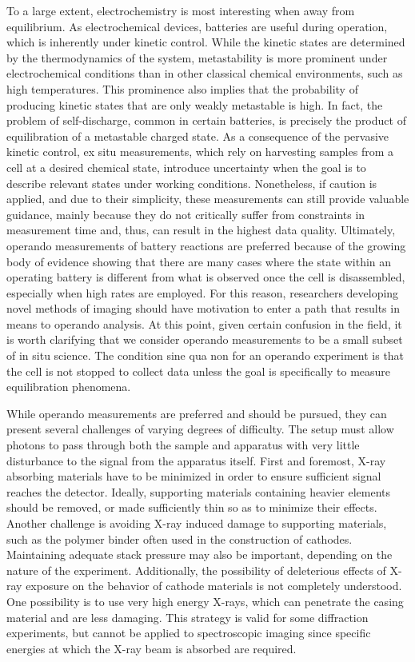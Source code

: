 \documentclass[journal=cmatex,manuscript=perspective]{achemso}
\begin{document}
To a large extent, electrochemistry is most interesting when away from
equilibrium. As electrochemical devices, batteries are useful during
operation, which is inherently under kinetic control. While the
kinetic states are determined by the thermodynamics of the system,
metastability is more prominent under electrochemical conditions than
in other classical chemical environments, such as high
temperatures. This prominence also implies that the probability of
producing kinetic states that are only weakly metastable is high. In
fact, the problem of self-discharge, common in certain batteries, is
precisely the product of equilibration of a metastable charged
state. As a consequence of the pervasive kinetic control, ex situ
measurements, which rely on harvesting samples from a cell at a
desired chemical state, introduce uncertainty when the goal is to
describe relevant states under working conditions. Nonetheless, if
caution is applied, and due to their simplicity, these measurements
can still provide valuable guidance\cite{yu2015-2}, mainly because
they do not critically suffer from constraints in measurement time
and, thus, can result in the highest data quality. Ultimately,
operando measurements of battery reactions are preferred because of
the growing body of evidence showing that there are many cases where
the state within an operating battery is different from what is
observed once the cell is disassembled\cite{liu2014, lim2016},
especially when high rates are employed. For this reason, researchers
developing novel methods of imaging should have motivation to enter a
path that results in means to operando analysis. At this point, given
certain confusion in the field, it is worth clarifying that we
consider operando measurements to be a small subset of in situ
science. The condition sine qua non for an operando
experiment is that the cell is not stopped to collect data unless the
goal is specifically to measure equilibration phenomena.

While operando measurements are preferred and should be pursued, they
can present several challenges of varying degrees of difficulty. The
setup must allow photons to pass through both the sample and apparatus
with very little disturbance to the signal from the apparatus
itself. First and foremost, X-ray absorbing materials have to be
minimized in order to ensure sufficient signal reaches the
detector. Ideally, supporting materials containing heavier elements
should be removed, or made sufficiently thin so as to minimize their
effects. Another challenge is avoiding X-ray induced damage to
supporting materials, such as the polymer binder often used in the
construction of cathodes. Maintaining adequate stack pressure may also
be important, depending on the nature of the
experiment\cite{borkiewicz2015}. Additionally, the possibility of
deleterious effects of X-ray exposure on the behavior of cathode
materials is not completely understood. One possibility is to use very
high energy X-rays, which can penetrate the casing
material\cite{lin2013} and are less damaging. This strategy is valid
for some diffraction experiments, but cannot be applied to
spectroscopic imaging since specific energies at which the X-ray beam
is absorbed are required.
\end{document}
